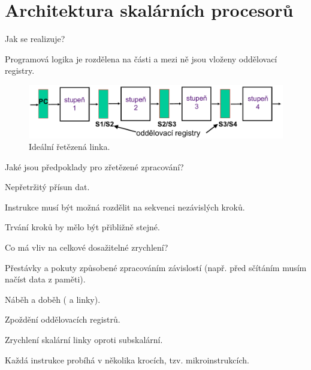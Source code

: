
\section{Architektura skalárních procesorů}

\begin{compactitem}
    \item Jak se realizuje? \begin{compactitem}
        \item Programová logika je rozdělena na části a mezi ně jsou vloženy oddělovací registry.
    \end{compactitem}

    \begin{figure}[H]
        \centering
        \includegraphics[width=1\linewidth]{idealni_retezena_linka.pdf}
        \caption{Ideální řetězená linka.}
    \end{figure}

    \item Jaké jsou předpoklady pro zřetězené zpracování? \begin{compactitem}
        \item Nepřetržitý přísun dat.
        \item Instrukce musí být možná rozdělit na sekvenci nezávislých kroků.
        \item Trvání kroků by mělo být přibližně stejné.
    \end{compactitem}

    \item Co má vliv na celkové dosažitelné zrychlení? \begin{compactitem}
        \item Přestávky a pokuty způsobené zpracováním závislostí (např. před sčítáním musím načíst data z paměti).
        \item Náběh a doběh ( a  linky).
        \item Zpoždění oddělovacích registrů.
    \end{compactitem}

    \item Zrychlení skalární linky oproti subskalární. \begin{compactitem}
        \item Každá instrukce probíhá v několika krocích, tzv. mikroinstrukcích.


\end{compactitem}
\end{compactitem}
